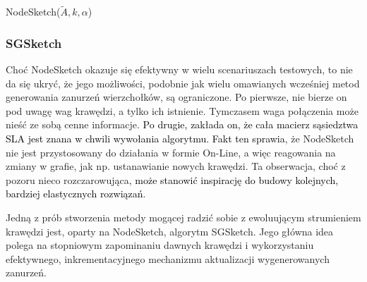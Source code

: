             \begin{algorithm}
                \caption{NodeSketch($\tilde{A},k,\alpha$)}\label{alg:node_sketch}
            \end{algorithm}

        \subsubsection*{SGSketch}
            Choć NodeSketch okazuje się efektywny w wielu scenariuszach testowych, to nie da się ukryć, że jego możliwości, podobnie jak wielu omawianych wcześniej metod generowania zanurzeń wierzchołków, są ograniczone. Po pierwsze, nie bierze on pod uwagę wag krawędzi, a tylko ich istnienie. Tymczasem waga połączenia może nieść ze sobą cenne informacje. \textcolor{black}{Po drugie, zakłada on, że cała macierz sąsiedztwa SLA jest znana w chwili wywołania algorytmu. Fakt ten sprawia}, że NodeSketch nie jest przystosowany do działania w formie On-Line, a więc reagowania na zmiany w grafie, jak np. ustanawianie nowych krawędzi. Ta obserwacja, choć z pozoru nieco rozczarowująca, \textcolor{black}{może stanowić inspirację do budowy kolejnych, bardziej elastycznych rozwiązań}. 

            Jedną z prób stworzenia metody mogącej radzić sobie z ewoluującym strumieniem krawędzi jest, oparty na NodeSketch, algorytm SGSketch\cite{Yang_Qu_Yang_Wang_Cudre-Mauroux_2022}. Jego główna idea polega na stopniowym zapominaniu dawnych krawędzi i wykorzystaniu efektywnego, inkrementacyjnego mechanizmu aktualizacji wygenerowanych zanurzeń.
            
